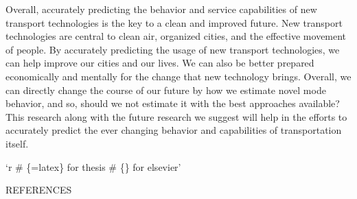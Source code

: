 \documentclass[12pt, oneside, openright]{byuthesis}
\begin{document}
Overall, accurately predicting the behavior and service capabilities of new transport technologies is the key to a clean and improved future. New transport technologies are central to clean air, organized cities, and the effective movement of people. By accurately predicting the usage of new transport technologies, we can help improve our cities and our lives. We can also be better prepared economically and mentally for the change that new technology brings. Overall, we can directly change the course of our future by how we estimate novel mode behavior, and so, should we not estimate it with the best approaches available? This research along with the future research we suggest will help in the efforts to accurately predict the ever changing behavior and capabilities of transportation itself.

`r
\# \{=latex\} for thesis
\# \{\} for elsevier'

\cleardoublepage
    \begin{centering}
    REFERENCES\\
     \baselineskip
    \end{centering}
    
\end{document}
